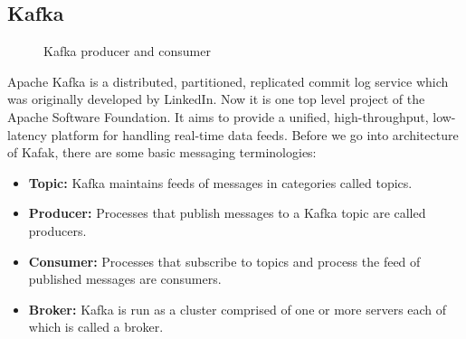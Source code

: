 \subsection{Kafka}
\begin{figure}
  \begin{center}
   \caption{Kafka producer and consumer \cite{Kafka}}
   \label{fig:kafka_producer_consumer}
  \end{center}
\end{figure}

Apache Kafka is a distributed, partitioned, replicated commit log service which was originally developed by LinkedIn. Now it is one top level project of the Apache Software Foundation. It aims to provide a unified, high-throughput, low-latency platform for handling real-time data feeds. Before we go into architecture of Kafak, there are some basic messaging terminologies: \cite{Kafka}

\begin{itemize}
  \item \textbf{Topic:} Kafka maintains feeds of messages in categories called topics. 
  \item \textbf{Producer:} Processes that publish messages to a Kafka topic are called producers.
  \item \textbf{Consumer:} Processes that subscribe to topics and process the feed of published messages are consumers.
   \item \textbf{Broker:} Kafka is run as a cluster comprised of one or more servers each of which is called a broker.
\end{itemize}

